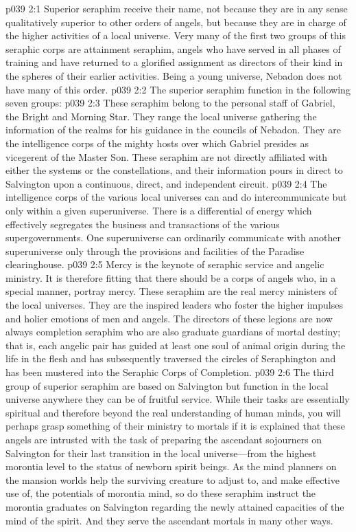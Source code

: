 \vs p039 2:1 Superior seraphim receive their name, not because they are in any sense qualitatively superior to other orders of angels, but because they are in charge of the higher activities of a local universe. Very many of the first two groups of this seraphic corps are attainment seraphim, angels who have served in all phases of training and have returned to a glorified assignment as directors of their kind in the spheres of their earlier activities. Being a young universe, Nebadon does not have many of this order.
\vs p039 2:2 The superior seraphim function in the following seven groups:
\pc \vs p039 2:3 \bibnobreakspace {} These seraphim belong to the personal staff of Gabriel, the Bright and Morning Star. They range the local universe gathering the information of the realms for his guidance in the councils of Nebadon. They are the intelligence corps of the mighty hosts over which Gabriel presides as vicegerent of the Master Son. These seraphim are not directly affiliated with either the systems or the constellations, and their information pours in direct to Salvington upon a continuous, direct, and independent circuit.
\vs p039 2:4 The intelligence corps of the various local universes can and do intercommunicate but only within a given superuniverse. There is a differential of energy which effectively segregates the business and transactions of the various supergovernments. One superuniverse can ordinarily communicate with another superuniverse only through the provisions and facilities of the Paradise clearinghouse.
\pc \vs p039 2:5 \bibnobreakspace {} Mercy is the keynote of seraphic service and angelic ministry. It is therefore fitting that there should be a corps of angels who, in a special manner, portray mercy. These seraphim are the real mercy ministers of the local universes. They are the inspired leaders who foster the higher impulses and holier emotions of men and angels. The directors of these legions are now always completion seraphim who are also graduate guardians of mortal destiny; that is, each angelic pair has guided at least one soul of animal origin during the life in the flesh and has subsequently traversed the circles of Seraphington and has been mustered into the Seraphic Corps of Completion.
\pc \vs p039 2:6 \bibnobreakspace {} The third group of superior seraphim are based on Salvington but function in the local universe anywhere they can be of fruitful service. While their tasks are essentially spiritual and therefore beyond the real understanding of human minds, you will perhaps grasp something of their ministry to mortals if it is explained that these angels are intrusted with the task of preparing the ascendant sojourners on Salvington for their last transition in the local universe---from the highest morontia level to the status of newborn spirit beings. As the mind planners on the mansion worlds help the surviving creature to adjust to, and make effective use of, the potentials of morontia mind, so do these seraphim instruct the morontia graduates on Salvington regarding the newly attained capacities of the mind of the spirit. And they serve the ascendant mortals in many other ways.
